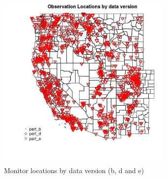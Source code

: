 
\begin{figure} 
\centering  
\includegraphics[width=0.77\textwidth]{Code_Outputs/PM25_obs_locations_by_data_version_Obs_Locations_versions_bde.jpg} 
\caption{\label{fig:PM25_obs_locations_by_data_versionObs_Locations_versions_bde}Monitor locations by data version (b, d and e)} 
\end{figure} 
 
